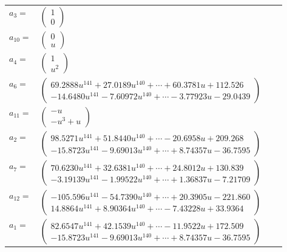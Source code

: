 \documentclass[1p]{elsarticle_modified}
\theoremstyle{definition}
\begin{document}
\begin{tabular}{m{7pt} m{180pt} m{7pt} m{180pt} }
\flushright $a_{3}=$&$\begin{pmatrix}1\\0\end{pmatrix}$ \\
\flushright $a_{10}=$&$\begin{pmatrix}0\\u\end{pmatrix}$ \\
\flushright $a_{4}=$&$\begin{pmatrix}1\\u^2\end{pmatrix}$ \\
\flushright $a_{6}=$&$\begin{pmatrix}69.2888 u^{141}+27.0189 u^{140}+\cdots+60.3781 u+112.526\\-14.6480 u^{141}-7.60972 u^{140}+\cdots-3.77923 u-29.0439\end{pmatrix}$ \\
\flushright $a_{11}=$&$\begin{pmatrix}- u\\- u^3+u\end{pmatrix}$ \\
\flushright $a_{2}=$&$\begin{pmatrix}98.5271 u^{141}+51.8440 u^{140}+\cdots-20.6958 u+209.268\\-15.8723 u^{141}-9.69013 u^{140}+\cdots+8.74357 u-36.7595\end{pmatrix}$ \\
\flushright $a_{7}=$&$\begin{pmatrix}70.6230 u^{141}+32.6381 u^{140}+\cdots+24.8012 u+130.839\\-3.19139 u^{141}-1.99522 u^{140}+\cdots+1.36837 u-7.21709\end{pmatrix}$ \\
\flushright $a_{12}=$&$\begin{pmatrix}-105.596 u^{141}-54.7390 u^{140}+\cdots+20.3905 u-221.860\\14.8864 u^{141}+8.90364 u^{140}+\cdots-7.43228 u+33.9364\end{pmatrix}$ \\
\flushright $a_{1}=$&$\begin{pmatrix}82.6547 u^{141}+42.1539 u^{140}+\cdots-11.9522 u+172.509\\-15.8723 u^{141}-9.69013 u^{140}+\cdots+8.74357 u-36.7595\end{pmatrix}$ \\

\end{tabular}
\end{document}
